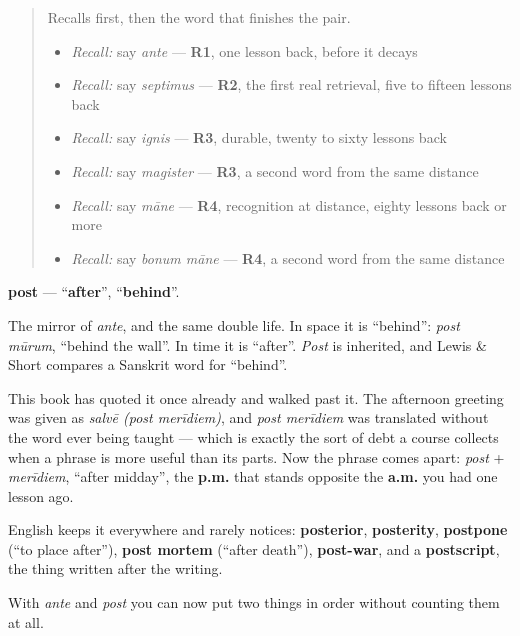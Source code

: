 \label{lesson:LA-C57-post}



\begin{quote}
Recalls first, then the word that finishes the pair.

\begin{itemize}
\raggedright
  \item \emph{Recall:} say \emph{ante} — \textbf{R1}, one lesson back, before it decays
  \item \emph{Recall:} say \emph{septimus} — \textbf{R2}, the first real retrieval, five to fifteen lessons back
  \item \emph{Recall:} say \emph{ignis} — \textbf{R3}, durable, twenty to sixty lessons back
  \item \emph{Recall:} say \emph{magister} — \textbf{R3}, a second word from the same distance
  \item \emph{Recall:} say \emph{māne} — \textbf{R4}, recognition at distance, eighty lessons back or more
  \item \emph{Recall:} say \emph{bonum māne} — \textbf{R4}, a second word from the same distance
\end{itemize}
\end{quote}

\begin{cousinweb}
\textbf{post} — \textquotedblleft{}\textbf{after}\textquotedblright{}, \textquotedblleft{}\textbf{behind}\textquotedblright{}.

The mirror of \emph{ante}, and the same double life. In space it is \textquotedblleft{}behind\textquotedblright{}: \emph{post mūrum}, \textquotedblleft{}behind the wall\textquotedblright{}. In time it is \textquotedblleft{}after\textquotedblright{}. \emph{Post} is inherited, and Lewis \& Short compares a Sanskrit word for \textquotedblleft{}behind\textquotedblright{}.

This book has quoted it once already and walked past it. The afternoon greeting was given as \emph{salvē (post merīdiem)}, and \emph{post merīdiem} was translated without the word ever being taught — which is exactly the sort of debt a course collects when a phrase is more useful than its parts. Now the phrase comes apart: \emph{post} + \emph{merīdiem}, \textquotedblleft{}after midday\textquotedblright{}, the \textbf{p.m.} that stands opposite the \textbf{a.m.} you had one lesson ago.

English keeps it everywhere and rarely notices: \textbf{posterior}, \textbf{posterity}, \textbf{postpone} (\textquotedblleft{}to place after\textquotedblright{}), \textbf{post mortem} (\textquotedblleft{}after death\textquotedblright{}), \textbf{post-war}, and a \textbf{postscript}, the thing written after the writing.

With \emph{ante} and \emph{post} you can now put two things in order without counting them at all.
\end{cousinweb}

